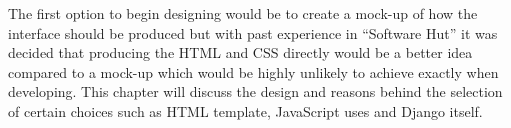 \documentclass[../main.tex]{subfiles}
\begin{document}
\raggedright
The first option to begin designing would be to create a mock-up of how the interface should be produced but with past experience in \enquote{Software Hut} it was decided that producing the HTML and CSS directly would be a better idea compared to a mock-up which would be highly unlikely to achieve exactly when developing. This chapter will discuss the design and reasons behind the selection of certain choices such as HTML template, JavaScript uses and Django itself. 
\end{document}
